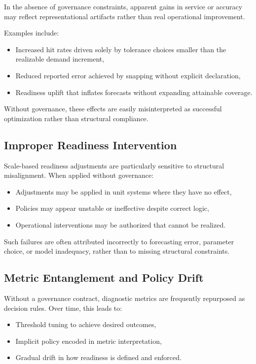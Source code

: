 In the absence of governance constraints, apparent gains in service or accuracy
may reflect representational artifacts rather than real operational improvement.

Examples include:
\begin{itemize}[leftmargin=1.5em]
  \item Increased hit rates driven solely by tolerance choices smaller than the
        realizable demand increment,
  \item Reduced reported error achieved by snapping without explicit declaration,
  \item Readiness uplift that inflates forecasts without expanding attainable
        coverage.
\end{itemize}

Without governance, these effects are easily misinterpreted as successful
optimization rather than structural compliance.

\subsection{Improper Readiness Intervention}

Scale-based readiness adjustments are particularly sensitive to structural
misalignment. When applied without governance:
\begin{itemize}[leftmargin=1.5em]
  \item Adjustments may be applied in unit systems where they have no effect,
  \item Policies may appear unstable or ineffective despite correct logic,
  \item Operational interventions may be authorized that cannot be realized.
\end{itemize}

Such failures are often attributed incorrectly to forecasting error, parameter
choice, or model inadequacy, rather than to missing structural constraints.

\subsection{Metric Entanglement and Policy Drift}

Without a governance contract, diagnostic metrics are frequently repurposed as
decision rules. Over time, this leads to:
\begin{itemize}[leftmargin=1.5em]
  \item Threshold tuning to achieve desired outcomes,
  \item Implicit policy encoded in metric interpretation,
  \item Gradual drift in how readiness is defined and enforced.
\end{itemize}


